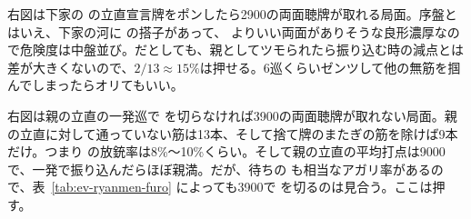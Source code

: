 \documentclass[../nankiru_main.tex]{subfiles}
\begin{document}
\begin{minipage}[t][6.5cm]{\textwidth}
  \begin{figure}\vspace{-1.5\topskip}
  \end{figure}

  右図は下家の  の立直宣言牌をポンしたら2900の両面聴牌が取れる局面。序盤とはいえ、下家の河に  の搭子があって、 よりいい両面がありそうな良形濃厚なので危険度は中盤並び。だとしても、親としてツモられたら振り込む時の減点とは差が大きくないので、$2/13 \approx 15\%$は押せる。6巡くらいゼンツして他の無筋を掴んでしまったらオリてもいい\citep[][pp.~174--175]{fkt}。
\end{minipage}

\begin{minipage}[t][6.5cm]{\textwidth}
  \begin{figure}\vspace{-1.5\topskip}
  \end{figure}
  
  右図は親の立直の一発巡で  を切らなければ3900の両面聴牌が取れない局面。親の立直に対して通っていない筋は13本、そして捨て牌のまたぎの筋を除けば9本だけ。つまり  の放銃率は8\%〜10\%くらい。そして親の立直の平均打点は9000で、一発で振り込んだらほぼ親満。だが、待ちの  も相当なアガリ率があるので、表~\ref{tab:ev-ryanmen-furo} によっても3900で  を切るのは見合う。ここは押す\citep[][pp.~176--177]{fkt}。
\end{minipage}
\end{document}
